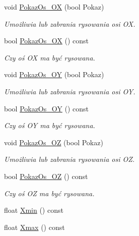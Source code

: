 \begin{DoxyCompactItemize}
\item 
void \hyperlink{class_pz_g_1_1_lacze_do_g_n_u_plota_a11421d7c67deab6b7524cc492407e897}{Pokaz\+Os\+\_\+\+OX} (bool Pokaz)
\begin{DoxyCompactList}\small\item\em Umożliwia lub zabrania rysowania osi OX. \end{DoxyCompactList}\item 
bool \hyperlink{class_pz_g_1_1_lacze_do_g_n_u_plota_ae112972af57167c3b053bf922bce6bbf}{Pokaz\+Os\+\_\+\+OX} () const
\begin{DoxyCompactList}\small\item\em Czy oś OX ma być rysowana. \end{DoxyCompactList}\item 
void \hyperlink{class_pz_g_1_1_lacze_do_g_n_u_plota_a7c3db909b266fc30808e86406c04b516}{Pokaz\+Os\+\_\+\+OY} (bool Pokaz)
\begin{DoxyCompactList}\small\item\em Umożliwia lub zabrania rysowania osi OY. \end{DoxyCompactList}\item 
bool \hyperlink{class_pz_g_1_1_lacze_do_g_n_u_plota_a7298f469f6932f5c808dcf620650b4b8}{Pokaz\+Os\+\_\+\+OY} () const
\begin{DoxyCompactList}\small\item\em Czy oś OY ma być rysowana. \end{DoxyCompactList}\item 
void \hyperlink{class_pz_g_1_1_lacze_do_g_n_u_plota_a9fabfe88cb1801a5de8923f45f514b99}{Pokaz\+Os\+\_\+\+OZ} (bool Pokaz)
\begin{DoxyCompactList}\small\item\em Umożliwia lub zabrania rysowania osi OZ. \end{DoxyCompactList}\item 
bool \hyperlink{class_pz_g_1_1_lacze_do_g_n_u_plota_a22c708af33c57bf3b5d1b4e82b4017b7}{Pokaz\+Os\+\_\+\+OZ} () const
\begin{DoxyCompactList}\small\item\em Czy oś OZ ma być rysowana. \end{DoxyCompactList}\item 
float \hyperlink{class_pz_g_1_1_lacze_do_g_n_u_plota_a66836c9749bf179420e4ca3e9447efd7}{Xmin} () const
\item 
float \hyperlink{class_pz_g_1_1_lacze_do_g_n_u_plota_a8e23479629af3df3d352b7839ae396b8}{Xmax} () const

\end{DoxyCompactItemize}
